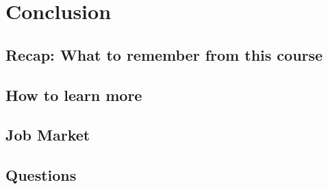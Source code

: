 



\begin{frame}
   \titlepage
\end{frame}



\begin{frame}
   \tableofcontents
\end{frame}

\section{Conclusion}


\subsection{Recap: What to remember from this course}



\subsection{How to learn more}



\subsection{Job Market}



\subsection{Questions}





